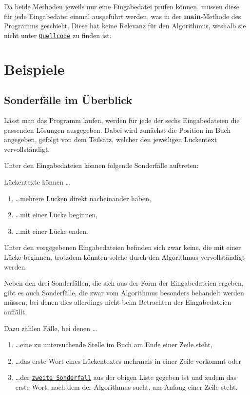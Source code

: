 \documentclass[a4paper, 10pt, ngerman]{scrartcl}
\begin{document}
Da beide Methoden jeweils nur eine Eingabedatei prüfen können,
müssen diese für jede Eingabedatei einmal ausgeführt werden,
was in der \textbf{main}-Methode des Programms geschieht.
Diese hat keine Relevanz für den Algorithmus,
weshalb sie nicht unter \hyperref[sec:quellcode]{\texttt{Quellcode}} zu finden ist.


\section{Beispiele}\label{sec:beispiele}
\subsection{Sonderfälle im Überblick}\label{ueberblickSondefaelle}
Lässt man das Programm laufen,
werden für jede der sechs Eingabedateien die passenden Lösungen ausgegeben.
Dabei wird zunächst die Position im Buch angegeben,
gefolgt von dem Teilsatz,
welcher den jeweiligen Lückentext vervollständigt.

Unter den Eingabedateien können folgende Sonderfälle auftreten:

Lückentexte können \ldots

\begin{enumerate}
	\item \ldots mehrere Lücken direkt nacheinander haben,\label{sonderfallEins}
	\item \ldots mit einer Lücke beginnen,\label{sonderfallZwei}
	\item \ldots mit einer Lücke enden.\label{sonderfallDrei}
    \setcounter{enumTemp}{\theenumi}
\end{enumerate}

Unter den vorgegebenen Eingabedateien befinden sich zwar keine,
die mit einer Lücke beginnen,
trotzdem könnten solche durch den Algorithmus vervollständigt werden.

Neben den drei Sonderfällen,
die sich aus der Form der Eingabedateien ergeben,
gibt es auch Sonderfälle,
die zwar vom Algorithmus besonders behandelt werden müssen,
bei denen dies allerdings nicht beim Betrachten der Eingabedateien auffällt.

Dazu zählen Fälle,
bei denen \ldots

\begin{enumerate}
	\setcounter{enumi}{\theenumTemp}
	\item \ldots eine zu untersuchende Stelle im Buch am Ende einer Zeile steht,\label{sonderfallVier}
	\item \ldots das erste Wort eines Lückentextes mehrmals in einer Zeile vorkommt oder\label{sonderfallFuenf}
	\item \ldots der \hyperref[sonderfallZwei]{\texttt{zweite Sonderfall}} aus der obigen Liste gegeben ist
	und zudem das erste Wort,
	nach dem der Algorithmus sucht,
	am Anfang einer Zeile steht.\label{sonderfallSechs}
\end{enumerate}
\end{document}
